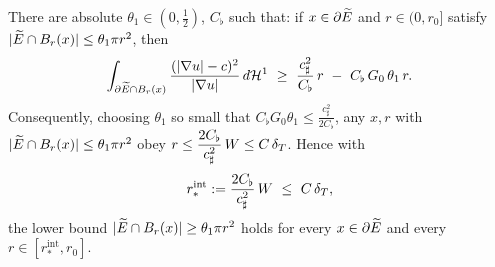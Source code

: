 \begin{proposition}\label{prop:lower-dens}
There are absolute $\theta_1\in(0,\tfrac12)$, $C_\flat$ such that: if
$x\in\partial\widetilde E$ and $r\in(0,r_0]$ satisfy $|\widetilde E\cap B_r(x)|\le
\theta_1\pi r^2$, then
\begin{equation}\label{eq:lower-mech}
   \int_{\partial\widetilde E\cap B_{r}(x)}\frac{(|\nabla u|-c)^2}{|\nabla u|}\,d\mathcal{H}^1
   \ \ge\ \frac{c_\sharp^2}{C_\flat}\,r\ -\ C_\flat\,G_0\,\theta_1\,r .
\end{equation}
Consequently, choosing $\theta_1$ so small that
$C_\flat G_0\theta_1\le \tfrac{c_\sharp^2}{2C_\flat}$, any $x,r$ with
$|\widetilde E\cap B_r(x)|\le\theta_1\pi r^2$ obey $r\le \dfrac{2C_\flat}
{c_\sharp^2}\,W\le C\,\delta_T$. Hence with
\begin{equation}\label{eq:rstar-int}
   r_*^{\mathrm{int}}:=\frac{2C_\flat}{c_\sharp^2}\,W\ \le\ C\,\dT,
\end{equation}
the lower bound $|\widetilde E\cap B_r(x)|\ge\theta_1\pi r^2$ holds for every
$x\in\partial\widetilde E$ and every $r\in[r_*^{\mathrm{int}},r_0]$.
\end{proposition}

